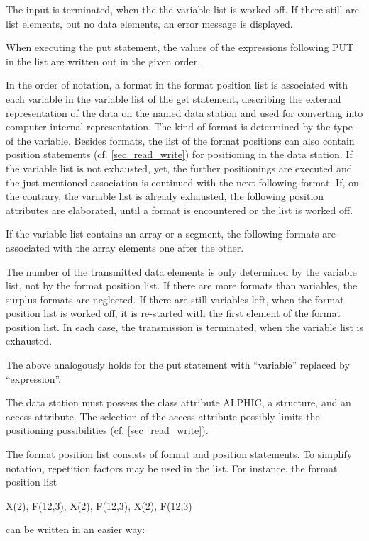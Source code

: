 The input is terminated, when the the variable list is worked off. If
there still are list elements, but no data elements, an error message is
displayed.

When executing the put statement, the values of the expressions
following PUT in the list are written out in the given order.

In the order of notation, a format in the format position list is
associated with each variable in the variable list of the get
statement, describing the external representation of the data on the
named data station and used for converting into computer internal
representation. The kind of format is determined by the type of the
variable. Besides formats, the list of the format positions can also
contain position statements (cf. \ref{sec_read_write})
for positioning in the data
station. If the variable list is not exhausted, yet, the further
positionings are executed and the just mentioned association is
continued with the next following format. If, on the contrary, the
variable list is already exhausted, the following position attributes
are elaborated, until a format is encountered or the list is worked off.

If the variable list contains an array or a segment, the following
formats are associated with the array elements one after the other.

The number of the transmitted data elements is only determined by the
variable list, not by the format position list. If there are more
formats than variables, the surplus formats are neglected. If there are
still variables left, when the format position list is worked off, it is
re-started with the first element of the format position list. In each
case, the transmission is terminated, when the variable list is
exhausted.

The above analogously holds for the put statement with ``variable''
replaced by ``expression''.

The data station must possess the class attribute ALPHIC, a structure,
and an access attribute. The selection of the access attribute possibly
limits the positioning possibilities (cf. \ref{sec_read_write}).

The format position list consists of format and position statements.
To simplify notation, repetition factors may be used in the list. For
instance, the format position list

X(2), F(12,3), X(2), F(12,3), X(2), F(12,3)

can be written in an easier way:

